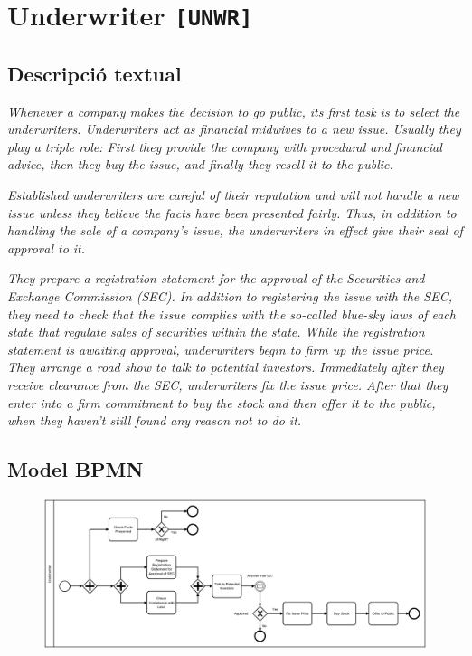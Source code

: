 \section{Underwriter \texttt{[UNWR]}}

\subsection*{Descripció textual}

\textit{Whenever a company makes the decision to go public, its first task is to select the underwriters. Underwriters act as financial midwives to a new issue. Usually they play a triple role: First they provide the company with procedural and financial advice, then they buy the issue, and finally they resell it to the public.}

\textit{Established underwriters are careful of their reputation and will not handle a new issue unless they believe the facts have been presented fairly. Thus, in addition to handling the sale of a company's issue, the underwriters in effect give their seal of approval to it.}

\textit{They prepare a registration statement for the approval of the Securities and Exchange Commission (SEC). In addition to registering the issue with the SEC, they need to check that the issue complies with the so-called blue-sky laws of each state that regulate sales of securities within the state. While the registration statement is awaiting approval, underwriters begin to firm up the issue price. They arrange a road show to talk to potential investors. Immediately after they receive clearance from the SEC, underwriters fix the issue price. After that they enter into a firm commitment to buy the stock and then offer it to the public, when they haven't still found any reason not to do it.}

\subsection*{Model BPMN}

\begin{figure}[!h]
    \centering
    \includegraphics[width=\textwidth]{figures/benchmark/Underwriter.png}
\end{figure}

